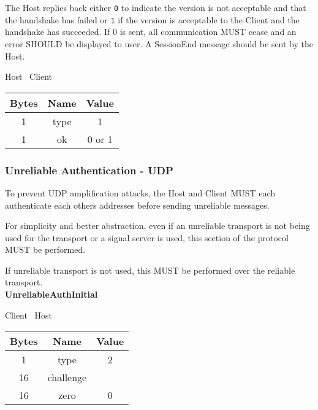 The Host replies back either \texttt{0} to indicate the version is not acceptable and that the handshake has
failed or \texttt{1} if the version is acceptable to the Client and the handshake has succeeded.
If 0 is sent, all communication MUST cease and an error SHOULD be displayed to user.
A SessionEnd message should be sent by the Host.

\begin{center}
    Host \textrightarrow\ Client\\
    \begin{tabular}{|c|c|c|}
        \hline
        \textbf{Bytes} & \textbf{Name} & \textbf{Value} \\
        \hline
        1              & type          & 1              \\
        \hline
        1              & ok            & 0 or 1         \\
        \hline
    \end{tabular}
\end{center}

\subsubsection{Unreliable Authentication - UDP}

To prevent UDP amplification attacks, the Host and Client MUST each authenticate each others addresses before sending
unreliable messages.

For simplicity and better abstraction, even if an unreliable transport is not being used for the transport or a
signal server is used, this section of the protocol MUST be performed.

If unreliable transport is not used, this MUST be performed over the reliable transport.\\

\textbf{UnreliableAuthInitial}
\begin{center}
    Client \textrightarrow\ Host\\
    \begin{tabular}{|c|c|c|}
        \hline
        \textbf{Bytes} & \textbf{Name} & \textbf{Value} \\
        \hline
        1              & type          & 2              \\
        \hline
        16             & challenge     &                \\
        \hline
        16             & zero          & 0              \\
        \hline
    \end{tabular}
\end{center}


